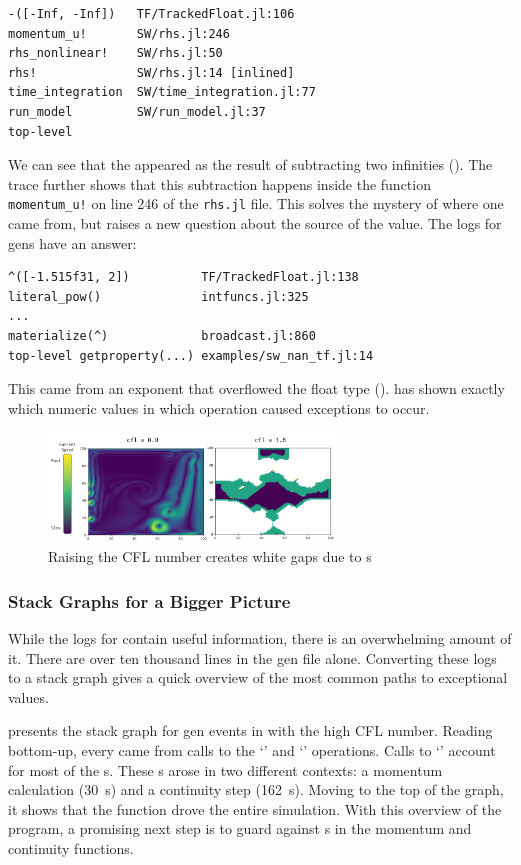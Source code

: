 \documentclass{juliacon}
\begin{document}
\begin{lstlisting}
-([-Inf, -Inf])   TF/TrackedFloat.jl:106
momentum_u!       SW/rhs.jl:246
rhs_nonlinear!    SW/rhs.jl:50
rhs!              SW/rhs.jl:14 [inlined]
time_integration  SW/time_integration.jl:77
run_model         SW/run_model.jl:37
top-level
\end{lstlisting}

We can see that the \NaN{} appeared as the result of subtracting two infinities ().
The trace further shows that this subtraction happens inside the function \texttt{momentum\_u!} on line 246 of the \texttt{rhs.jl} file.
This solves the mystery of where one \NaN{} came from, but raises a new question
about the source of the \Inf{} value.
The logs for \Inf{} gens have an answer:

\begin{lstlisting}
^([-1.515f31, 2])          TF/TrackedFloat.jl:138
literal_pow()              intfuncs.jl:325
...
materialize(^)             broadcast.jl:860
top-level getproperty(...) examples/sw_nan_tf.jl:14
\end{lstlisting}
%
This \Inf{} came from an exponent that overflowed the float type ().
\TF{} has shown exactly which numeric values in which operation
caused exceptions to occur.

\begin{figure}[t]
  \centering
  \includegraphics[width=3in]{./fig/shallow_waters_cfl_diff.pdf}
  \caption{Raising the CFL number creates white gaps due to \NaN{}s}
  \label{fig:sw_nans}
\end{figure}


\subsubsection{Stack Graphs for a Bigger Picture}

While the logs for \ShallowWaters{} contain useful information,
there is an overwhelming amount of it.
There are over ten thousand lines in the gen file alone.
Converting these logs to a stack graph gives a quick overview
of the most common paths to exceptional values.

 presents the stack graph for \NaN{} gen events
in \ShallowWaters{} with the high CFL number.
Reading bottom-up, every \NaN{} came from calls to the `\code{-}' and `\code{+}' operations.
Calls to `\code{+}' account for most of the \NaN{}s.
These \NaN{}s arose in two different contexts:
a momentum calculation (30~\NaN{}s) and
a continuity step (162~\NaN{}s).
Moving to the top of the graph, it shows that the function  drove
the entire simulation.
With this overview of the program, a promising next step is to guard against \NaN{}s
in the momentum and continuity functions.
\end{document}
